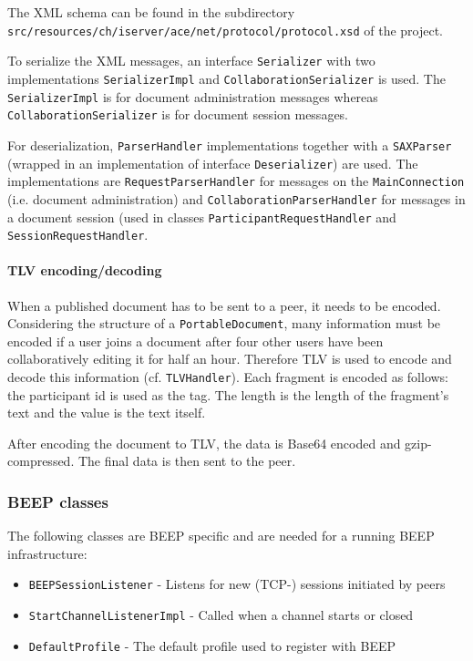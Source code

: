 The XML schema can be found in the subdirectory \texttt{src/\-resources/\-ch/\-iserver/\-ace/\-net/\-protocol/\-protocol.xsd} of the project.

To serialize the XML messages, an interface \texttt{Serializer} with two implementations \texttt{SerializerImpl} and \texttt{CollaborationSerializer} is used. The \texttt{SerializerImpl} is for document administration messages whereas \texttt{CollaborationSerializer} is for document session messages.

For deserialization, \texttt{ParserHandler} implementations together with a \texttt{SAXParser} (wrapped in an implementation of interface \texttt{Deserializer}) are used. The implementations are \texttt{RequestParserHandler} for messages on the \texttt{MainConnection} (i.e. document administration) and \texttt{CollaborationParserHandler} for messages in a document session (used in classes \texttt{ParticipantRequestHandler} and \texttt{SessionRequestHandler}.


\paragraph{TLV encoding/decoding}
When a published document has to be sent to a peer, it needs to be encoded. Considering the structure of a \texttt{PortableDocument}, many information must be encoded if a user joins a document after four other users have been collaboratively editing it for half an hour. Therefore TLV is used to encode and decode this information (cf. \texttt{TLVHandler}). Each fragment is encoded as follows: the participant id is used as the tag. The length is the length of the fragment's text and the value is the text itself. 

After encoding the document to TLV, the data is Base64 encoded and gzip-compressed. The final data is then sent to the peer.


\subsubsection{BEEP classes}
The following classes are BEEP specific and are needed for a running BEEP infrastructure:

\begin{itemize}
\item \texttt{BEEPSessionListener}		- 	Listens for new (TCP-) sessions initiated by peers
\item \texttt{StartChannelListenerImpl} 	-	Called when a channel starts or closed 
\item \texttt{DefaultProfile}				-	The default profile used to register with BEEP
\end{itemize}


